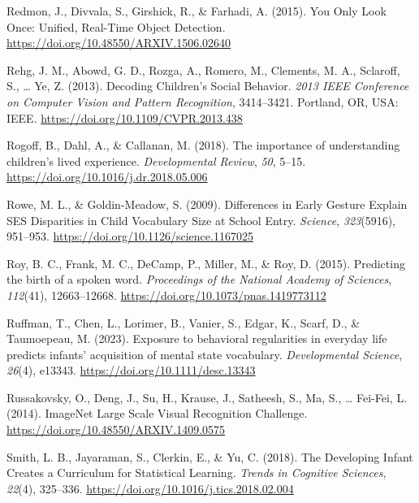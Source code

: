 \documentclass[
  man,floatsintext]{apa6}
\newlength{\cslhangindent}
\newenvironment{CSLReferences}[2] %
 {\begin{list}{}{%
  \setlength{\itemindent}{0pt}
  \setlength{\leftmargin}{0pt}
  \setlength{\parsep}{0pt}
  \ifodd #1
   \setlength{\leftmargin}{\cslhangindent}
   \setlength{\itemindent}{-1\cslhangindent}
  \fi
  \setlength{\itemsep}{#2\baselineskip}}}
 {\end{list}}
\begin{document}
\begin{CSLReferences}{1}{0}
Redmon, J., Divvala, S., Girshick, R., \& Farhadi, A. (2015). You {Only Look Once}: {Unified}, {Real-Time Object Detection}. \url{https://doi.org/10.48550/ARXIV.1506.02640}

Rehg, J. M., Abowd, G. D., Rozga, A., Romero, M., Clements, M. A., Sclaroff, S., \ldots{} Ye, Z. (2013). Decoding {Children}'s {Social Behavior}. \emph{2013 {IEEE Conference} on {Computer Vision} and {Pattern Recognition}}, 3414--3421. Portland, OR, USA: IEEE. \url{https://doi.org/10.1109/CVPR.2013.438}

Rogoff, B., Dahl, A., \& Callanan, M. (2018). The importance of understanding children's lived experience. \emph{Developmental Review}, \emph{50}, 5--15. \url{https://doi.org/10.1016/j.dr.2018.05.006}

Rowe, M. L., \& Goldin-Meadow, S. (2009). Differences in {Early Gesture Explain SES Disparities} in {Child Vocabulary Size} at {School Entry}. \emph{Science}, \emph{323}(5916), 951--953. \url{https://doi.org/10.1126/science.1167025}

Roy, B. C., Frank, M. C., DeCamp, P., Miller, M., \& Roy, D. (2015). Predicting the birth of a spoken word. \emph{Proceedings of the National Academy of Sciences}, \emph{112}(41), 12663--12668. \url{https://doi.org/10.1073/pnas.1419773112}

Ruffman, T., Chen, L., Lorimer, B., Vanier, S., Edgar, K., Scarf, D., \& Taumoepeau, M. (2023). Exposure to behavioral regularities in everyday life predicts infants' acquisition of mental state vocabulary. \emph{Developmental Science}, \emph{26}(4), e13343. \url{https://doi.org/10.1111/desc.13343}

Russakovsky, O., Deng, J., Su, H., Krause, J., Satheesh, S., Ma, S., \ldots{} Fei-Fei, L. (2014). {ImageNet Large Scale Visual Recognition Challenge}. \url{https://doi.org/10.48550/ARXIV.1409.0575}

Smith, L. B., Jayaraman, S., Clerkin, E., \& Yu, C. (2018). The {Developing Infant Creates} a {Curriculum} for {Statistical Learning}. \emph{Trends in Cognitive Sciences}, \emph{22}(4), 325--336. \url{https://doi.org/10.1016/j.tics.2018.02.004}


\end{CSLReferences}
\end{document}
